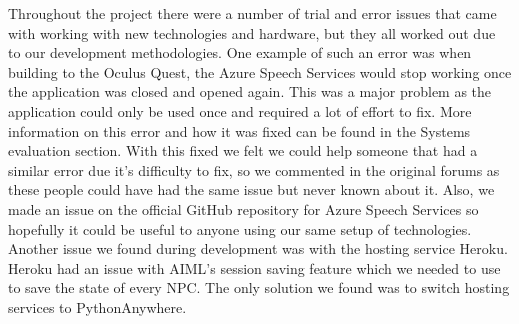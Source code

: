 Throughout the project there were a number of trial and error issues that came with working with new technologies and hardware, but they all worked out due to our development methodologies. One example of such an error was when building to the Oculus Quest, the Azure Speech Services would stop working once the application was closed and opened again. This was a major problem as the application could only be used once and required a lot of effort to fix. More information on this error and how it was fixed can be found in the Systems evaluation section. With this fixed we felt we could help someone that had a similar error due it's difficulty to fix, so we commented in the original forums as these people could have had the same issue but never known about it. Also, we made an issue on the official GitHub repository for Azure Speech Services so hopefully it could be useful to anyone using our same setup of technologies. Another issue we found during development was with the hosting service Heroku. Heroku had an issue with AIML's session saving feature which we needed to use to save the state of every NPC. The only solution we found was to switch hosting services to PythonAnywhere.


